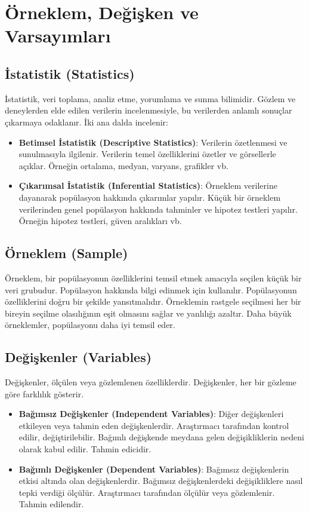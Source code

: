 \section{Örneklem, Değişken ve Varsayımları}
\subsection{İstatistik (Statistics)}
İstatistik, veri toplama, analiz etme, yorumlama ve sunma bilimidir. Gözlem ve deneylerden elde edilen verilerin incelenmesiyle, bu verilerden anlamlı sonuçlar çıkarmaya odaklanır. İki ana dalda incelenir:

\begin{itemize}
	\item \textbf{Betimsel İstatistik (Descriptive Statistics)}: Verilerin özetlenmesi ve sunulmasıyla ilgilenir. Verilerin temel özelliklerini özetler ve görsellerle açıklar. Örneğin ortalama, medyan, varyans, grafikler vb.
	\item \textbf{Çıkarımsal İstatistik (Inferential Statistics)}: Örneklem verilerine dayanarak popülasyon hakkında çıkarımlar yapılır. Küçük bir örneklem verilerinden genel popülasyon hakkında tahminler ve hipotez testleri yapılır. Örneğin hipotez testleri, güven aralıkları vb.
\end{itemize}

\subsection{Örneklem (Sample)}
Örneklem, bir popülasyonun özelliklerini temsil etmek amacıyla seçilen küçük bir veri grubudur. Popülasyon hakkında bilgi edinmek için kullanılır. Popülasyonun özelliklerini doğru bir şekilde yansıtmalıdır. Örneklemin rastgele seçilmesi her bir bireyin seçilme olasılığının eşit olmasını sağlar ve yanlılığı azaltır. Daha büyük örneklemler, popülasyonu daha iyi temsil eder.

\subsection{Değişkenler (Variables)}
Değişkenler, ölçülen veya gözlemlenen özelliklerdir. Değişkenler, her bir gözleme göre farklılık gösterir. 

\begin{itemize}
	\item \textbf{Bağımsız Değişkenler (Independent Variables)}: Diğer değişkenleri etkileyen veya tahmin eden değişkenlerdir. Araştırmacı tarafından kontrol edilir, değiştirilebilir. Bağımlı değişkende meydana gelen değişikliklerin nedeni olarak kabul edilir. Tahmin edicidir.
	\item \textbf{Bağımlı Değişkenler (Dependent Variables)}:  Bağımsız değişkenlerin etkisi altında olan değişkenlerdir. Bağımsız değişkenlerdeki değişikliklere nasıl tepki verdiği ölçülür. Araştırmacı tarafından ölçülür veya gözlemlenir. Tahmin edilendir.
\end{itemize}


